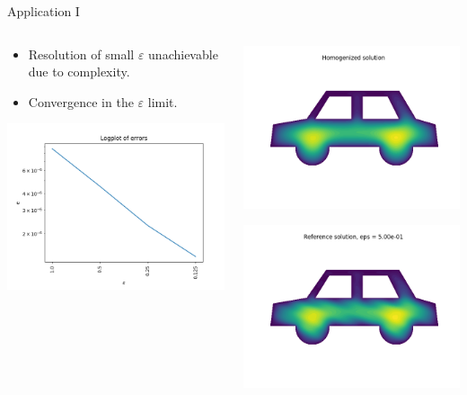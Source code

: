 \documentclass{beamer}
\renewcommand{\epsilon}{\varepsilon}
\begin{document}
\begin{frame}[t]{Application I}
  \begin{columns}
    \begin{column}[c]{.5\textwidth}
      \begin{itemize}
      \item Resolution of small $\epsilon$ unachievable due to complexity.
      \item Convergence in the  $\epsilon$ limit.
      \end{itemize}
      \includegraphics[width=0.65\linewidth]{carw_errors.png}
  \end{column}
  \begin{column}[c]{.5\textwidth}
    
    \includegraphics[width=0.65\linewidth]{carw_homogenized.png}

    \includegraphics[width=0.65\linewidth]{carw_reference_eps_power_1.png}
    

\end{column}
\end{columns}
\end{frame}
\end{document}

